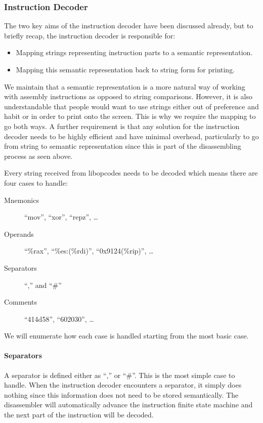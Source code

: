 \subsubsection{Instruction Decoder}

The two key aims of the instruction decoder have been discussed already, but to briefly recap, the instruction decoder is responsible for:

\begin{itemize}
\item Mapping strings representing instruction parts to a semantic representation.
\item Mapping this semantic representation back to string form for printing.
\end{itemize}

We maintain that a semantic representation is a more natural way of working with assembly instructions as opposed to string comparisons. However, it is also understandable that people would want to use strings either out of preference and habit or in order to print onto the screen. This is why we require the mapping to go both ways. A further requirement is that any solution for the instruction decoder needs to be highly efficient and have minimal overhead, particularly to go from string to semantic representation since this is part of the disassembling process as seen above.

Every string received from libopcodes needs to be decoded which means there are four cases to handle:

\begin{description}
\item [Mnemonics] \enquote{mov}, \enquote{xor}, \enquote{repz}, \ldots
\item [Operands] \enquote{\%rax}, \enquote{\%es:(\%rdi)}, \enquote{0x9124(\%rip)}, \ldots
\item [Separators] \enquote{,} and \enquote{\#}
\item [Comments] \enquote{414d58}, \enquote{602030}, \ldots
\end{description}

We will enumerate how each case is handled starting from the most basic case.

\paragraph{Separators}

A separator is defined either as \enquote{,} or \enquote{\#}. This is the most simple case to handle. When the instruction decoder encounters a separator, it simply does nothing since this information does not need to be stored semantically. The disassembler will automatically advance the instruction finite state machine and the next part of the instruction will be decoded.

